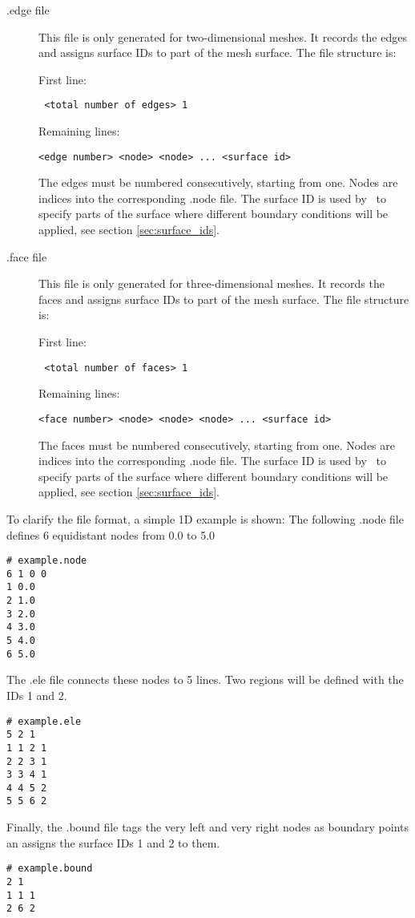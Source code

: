 \begin{description}
\item[.edge file] This file is only generated for two-dimensional meshes.
  It records the edges and assigns surface IDs to part of the mesh surface.
  The file structure is:

First line:
\begin{lstlisting}
 <total number of edges> 1
\end{lstlisting}
Remaining lines:
\begin{lstlisting} 
<edge number> <node> <node> ... <surface id>
\end{lstlisting}  
The edges must be numbered consecutively, starting from one. Nodes are
indices into the corresponding .node file. The surface ID is used by
\fluidity\ to specify parts of the surface where different boundary
conditions will be applied, see section \ref{sec:surface_ids}.


\item[.face file] This file is only generated for three-dimensional meshes.
  It records the faces and assigns surface IDs to part of the mesh surface. The
  file structure is:

First line:
\begin{lstlisting}
 <total number of faces> 1
\end{lstlisting}
Remaining lines:
\begin{lstlisting} 
<face number> <node> <node> <node> ... <surface id>
\end{lstlisting}  
The faces must be numbered consecutively, starting from one. Nodes are
indices into the corresponding .node file. The surface ID is used by
\fluidity\ to specify parts of the surface where different boundary
conditions will be applied, see section \ref{sec:surface_ids}.
\end{description}

To clarify the file format, a simple 1D example is shown: 
The following .node file defines 6 equidistant nodes from 0.0 to 5.0
\begin{lstlisting}
# example.node
6 1 0 0
1 0.0
2 1.0
3 2.0
4 3.0
5 4.0
6 5.0
\end{lstlisting}
The .ele file connects these nodes to 5 lines. Two regions will be defined with the IDs 1 and 2.
\begin{lstlisting}
# example.ele
5 2 1
1 1 2 1
2 2 3 1
3 3 4 1
4 4 5 2
5 5 6 2
\end{lstlisting}
Finally, the .bound file tags the very left and very right nodes as boundary
points an assigns the surface IDs 1 and 2 to them.
\begin{lstlisting}
# example.bound
2 1
1 1 1
2 6 2
\end{lstlisting}

